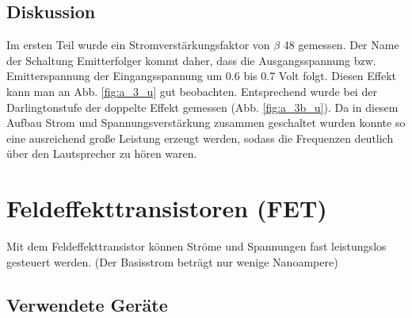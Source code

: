 \documentclass[12pt,a4paper]{article}
\begin{document}
\subsection{Diskussion}
Im ersten Teil wurde ein Stromverstärkungsfaktor von $\beta$ 48 gemessen. Der Name der Schaltung Emitterfolger kommt daher, dass die Ausgangsspannung bzw. Emitterspannung der Eingangsspannung um 0.6 bis 0.7 Volt folgt. Diesen Effekt kann man an Abb. \ref{fig:a_3_u} gut beobachten. Entsprechend wurde bei der Darlingtonstufe der doppelte Effekt gemessen (Abb. \ref{fig:a_3b_u}). Da in diesem Aufbau Strom und Spannungsverstärkung zusammen geschaltet wurden konnte so eine ausreichend große Leistung erzeugt werden, sodass die Frequenzen deutlich über den Lautsprecher zu hören waren.


\section{Feldeffekttransistoren (FET)}
Mit dem Feldeffekttransistor können Ströme und Spannungen fast leistungslos gesteuert werden. (Der Basisstrom beträgt nur wenige Nanoampere)
\subsection{Verwendete Geräte}
\end{document}
